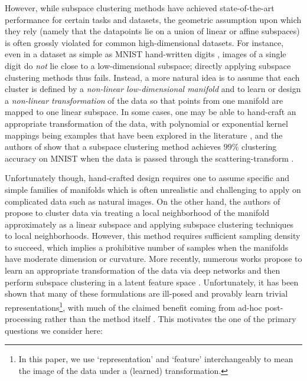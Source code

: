 \documentclass[10pt,twocolumn,letterpaper]{article}
\begin{document}
   






   However, while subspace clustering methods have achieved state-of-the-art performance for certain tasks and datasets, the geometric assumption upon which they rely (namely that the datapoints lie on a union of linear or affine subspaces) is often grossly violated for common high-dimensional datasets. For instance, even in a dataset as simple as MNIST hand-written digits \cite{lecun1998mnist}, images of a single digit do \textit{not} lie close to a low-dimensional subspace; directly applying subspace clustering methods thus fails. Instead, a more natural idea is to assume that each cluster is defined by a \textit{non-linear low-dimensional manifold} and to learn or design a \textit{non-linear transformation} of the data so that points from one manifold are mapped to one linear subspace.  In some cases, one may be able to hand-craft an appropriate transformation of the data, with polynomial or exponential kernel mappings being examples that have been explored in the literature \cite{Elhamifar2011-ca}, and the authors of \cite{Lim2020-sh} show that a subspace clustering method achieves $99\%$ clustering accuracy on MNIST when the data is passed through the scattering-transform \cite{Bruna2013-ru}. 


   
   


Unfortunately though, hand-crafted design requires one to assume specific and simple families of manifolds %
which is often unrealistic and challenging to apply on complicated data such as natural images. On the other hand, the authors of \cite{Elhamifar2011-ca} propose to cluster data via treating a local neighborhood of the manifold approximately as a linear subspace and applying subspace clustering techniques to local neighborhoods. However, this method requires sufficient sampling density to succeed, which implies a prohibitive number of samples when the manifolds have moderate dimension or curvature. 
    More recently, numerous works propose to learn an appropriate transformation of the data via deep networks and then perform subspace clustering in a latent feature space \cite{Peng2017-gf,Ji2017-yx,Abavisani2018-lt,Zhang2019-yp,Kheirandishfard2020-zc}. Unfortunately, it has been shown that many of these formulations are ill-posed and provably learn trivial representations\footnote{In this paper, we use `representation' and `feature' interchangeably to mean the image of the data under a (learned) transformation.}, with much of the claimed benefit coming from ad-hoc post-processing rather than the method itself \cite{Haeffele2020-kj}. This motivates the one of the primary questions we consider here: 
   
\end{document}
